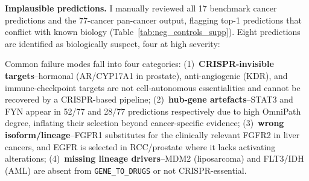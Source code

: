 \documentclass[11pt]{article}
\begin{document}
\textbf{Implausible predictions.} I manually reviewed all 17 benchmark cancer predictions and the 77-cancer pan-cancer output, flagging top-1 predictions that conflict with known biology (Table~\ref{tab:neg_controls_supp}). Eight predictions are identified as biologically suspect, four at high severity:

\begin{table}[htbp]
\centering
\caption{\textbf{Implausible high-confidence ALIN predictions (negative controls).} Eight predictions flagged as biologically suspect. Severity: high = target class has no clinical rationale in the cancer type; moderate = target selection reflects algorithmic artefact (hub bias, wrong isoform) rather than cancer-specific biology.}
\label{tab:neg_controls_supp}
\end{table}

\noindent Common failure modes fall into four categories: (1)~\textbf{CRISPR-invisible targets}--hormonal (AR/CYP17A1 in prostate), anti-angiogenic (KDR), and immune-checkpoint targets are not cell-autonomous essentialities and cannot be recovered by a CRISPR-based pipeline; (2)~\textbf{hub-gene artefacts}--STAT3 and FYN appear in 52/77 and 28/77 predictions respectively due to high OmniPath degree, inflating their selection beyond cancer-specific evidence; (3)~\textbf{wrong isoform/lineage}--FGFR1 substitutes for the clinically relevant FGFR2 in liver cancers, and EGFR is selected in RCC/prostate where it lacks activating alterations; (4)~\textbf{missing lineage drivers}--MDM2 (liposarcoma) and FLT3/IDH (AML) are absent from \texttt{GENE\_TO\_DRUGS} or not CRISPR-essential.
\end{document}
